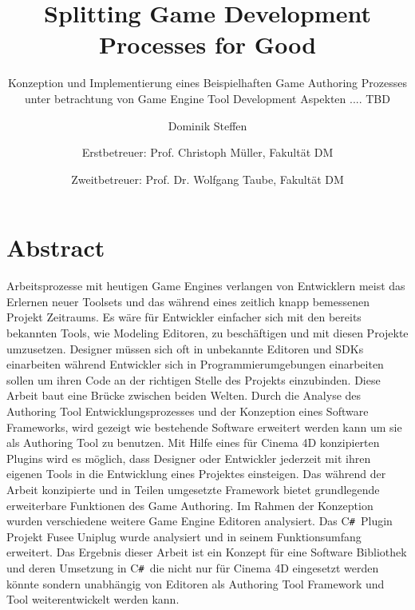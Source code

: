 \documentclass[pagesize, paper=a4, fontsize=12pt, titlepage=true, headings=small, headnosepline, abstractoff, liststotoc, nochapterprefix, plainheadsepline, twoside]{scrreprt}
\author{
Dominik Steffen \and
Erstbetreuer: Prof. Christoph Müller, Fakultät DM \and
Zweitbetreuer: Prof. Dr. Wolfgang Taube, Fakultät DM
}
\title{Splitting Game Development Processes for Good}
\subtitle{Konzeption und Implementierung eines Beispielhaften Game Authoring Prozesses unter betrachtung von Game Engine Tool Development Aspekten .... TBD}
\newcommand{\CSS}{C\texttt{\# }}
\begin{document}



\newpage
\thispagestyle{empty}
\mbox{}

\begingroup
\newpage
\pagestyle{empty}
\renewcommand*{\chapterpagestyle}{empty}
\chapter*{Abstract}%
Arbeitsprozesse mit heutigen Game Engines verlangen von Entwicklern meist das Erlernen neuer Toolsets und das während eines zeitlich knapp bemessenen Projekt Zeitraums. Es wäre für Entwickler einfacher sich mit den bereits bekannten Tools, wie Modeling Editoren, zu beschäftigen und mit diesen Projekte umzusetzen. Designer müssen sich oft in unbekannte Editoren und SDKs einarbeiten während Entwickler sich in Programmierumgebungen einarbeiten sollen um ihren Code an der richtigen Stelle des Projekts einzubinden.
Diese Arbeit baut eine Brücke zwischen beiden Welten. Durch die Analyse des Authoring Tool Entwicklungsprozesses und der Konzeption eines Software Frameworks, wird gezeigt wie bestehende Software erweitert werden kann um sie als Authoring Tool zu benutzen. Mit Hilfe eines für Cinema 4D konzipierten Plugins wird es möglich, dass Designer oder Entwickler jederzeit mit ihren eigenen Tools in die Entwicklung eines Projektes einsteigen. Das während der Arbeit konzipierte und in Teilen umgesetzte Framework bietet grundlegende erweiterbare Funktionen des Game Authoring. Im Rahmen der Konzeption wurden verschiedene weitere Game Engine Editoren analysiert. Das \CSS Plugin Projekt Fusee Uniplug wurde analysiert und in seinem Funktionsumfang erweitert. Das Ergebnis dieser Arbeit ist ein Konzept für eine Software Bibliothek und deren Umsetzung in \CSS die nicht nur für Cinema 4D eingesetzt werden könnte sondern unabhängig von Editoren als Authoring Tool Framework und Tool weiterentwickelt werden kann.

\clearpage
\endgroup
\end{document}
